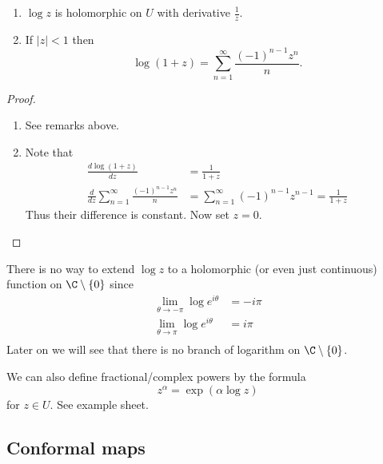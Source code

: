 \documentclass[a4paper]{article}
\begin{document}
\begin{proposition}\leavevmode
  \begin{enumerate}
  \item \(\log z\) is holomorphic on \(U\) with derivative \(\frac{1}{z}\).
  \item If \(|z| < 1\) then
    \[
      \log(1 + z) = \sum_{n = 1}^\infty \frac{(-1)^{n - 1}z^n}{n}.
    \]
  \end{enumerate}
\end{proposition}

\begin{proof}\leavevmode
  \begin{enumerate}
  \item See remarks above.
  \item Note that
    \begin{align*}
      \frac{d \log(1 + z)}{dz}
      &= \frac{1}{1 + z} \\
      \frac{d}{dz} \sum_{n = 1}^\infty \frac{(-1)^{n - 1}z^n}{n}
      &= \sum_{n = 1}^\infty (-1)^{n - 1}z^{n -1}
        = \frac{1}{1 + z}
    \end{align*}
    Thus their difference is constant. Now set \(z = 0\).
  \end{enumerate}
\end{proof}

\begin{remark}
  There is no way to extend \(\log z\) to a holomorphic (or even just continuous) function on \(\C \setminus \{0\}\) since
  \begin{align*}
    \lim_{\theta \to -\pi} \log e^{i\theta} &= -i\pi \\
    \lim_{\theta \to \pi} \log e^{i\theta} &= i\pi \\
  \end{align*}
  Later on we will see that there is no branch of logarithm on \(\C \setminus \{0\}\).
\end{remark}

We can also define fractional/complex powers by the formula
\[
  z^\alpha = \exp (\alpha \log z)
\]
for \(z \in U\). See example sheet.

\subsection{Conformal maps}
\end{document}
